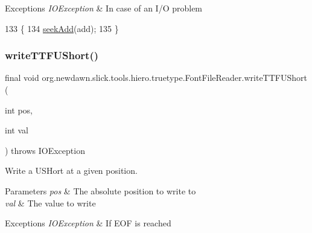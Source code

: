 \begin{DoxyExceptions}{Exceptions}
{\em I\+O\+Exception} & In case of an I/O problem \\
\hline
\end{DoxyExceptions}

\begin{DoxyCode}
133                                                   \{
134         \mbox{\hyperlink{classorg_1_1newdawn_1_1slick_1_1tools_1_1hiero_1_1truetype_1_1_font_file_reader_a37dae90ed06904b56b3e941998520174}{seekAdd}}(add);
135     \}
\end{DoxyCode}
\mbox{\label{classorg_1_1newdawn_1_1slick_1_1tools_1_1hiero_1_1truetype_1_1_font_file_reader_af54e507e6214364524b6223add00d11c}} 
\subsubsection{\texorpdfstring{write\+T\+T\+F\+U\+Short()}{writeTTFUShort()}}
{\footnotesize\ttfamily final void org.\+newdawn.\+slick.\+tools.\+hiero.\+truetype.\+Font\+File\+Reader.\+write\+T\+T\+F\+U\+Short (\begin{DoxyParamCaption}\item[{int}]{pos,  }\item[{int}]{val }\end{DoxyParamCaption}) throws I\+O\+Exception\hspace{0.3cm}{\ttfamily [inline]}}

Write a U\+S\+Hort at a given position.


\begin{DoxyParams}{Parameters}
{\em pos} & The absolute position to write to \\
\hline
{\em val} & The value to write \\
\hline
\end{DoxyParams}

\begin{DoxyExceptions}{Exceptions}
{\em I\+O\+Exception} & If E\+OF is reached \\
\hline
\end{DoxyExceptions}

